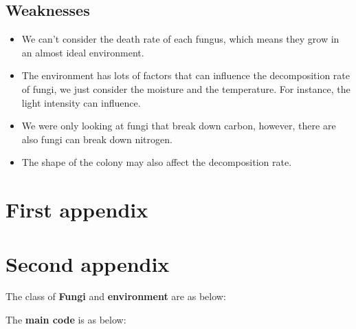 \documentclass{mcmthesis}
\begin{document}
\subsection{Weaknesses}
\begin{itemize}
  \item We can't consider the death rate of each fungus, which means they grow in an almost ideal environment.
  \item The environment has lots of factors that can influence the decomposition rate of fungi, we just consider the moisture and the temperature.
  For instance, the light intensity can influence.
  \item We were only looking at fungi that break down carbon, however, there are also fungi can break down nitrogen.
  \item The shape of the colony may also affect the decomposition rate.
\end{itemize}

\medskip





\begin{appendices}

\section{First appendix}

\section{Second appendix}

% 
The class of \textcolor[rgb]{0.98,0,0}{\textbf{Fungi}} and \textcolor[rgb]{0.98,0,0}{\textbf{environment}} are as below:


The \textcolor[rgb]{0.98,0,0}{\textbf{main code}} is as below:


\end{appendices}
\end{document}
